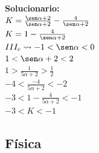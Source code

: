 \begin{enumerate}
\vspace{2mm}
\textbf{Solucionario:}\\
$K= \frac{\sen\alpha+2}{\sen\alpha+2}-\frac{4}{\sen\alpha+2}$\\
$K= 1-\frac{4}{\sen\alpha+2}$\\
$III_c \rightsquigarrow -1< \sen\alpha < 0  $\\
$1< \sen\alpha+2 < 2$\\
$1>\frac{1}{5\alpha+2}>\frac{1}{2}$\\
$-4<\frac{-4}{5\alpha+2}<-2 $\\
$-3<1-\frac{4}{5\alpha+2}<-1 $\\
$-3<K<-1 $\\
\vspace{6mm}

\end{enumerate}

\vspace{6mm}


\subsection*{Física}


